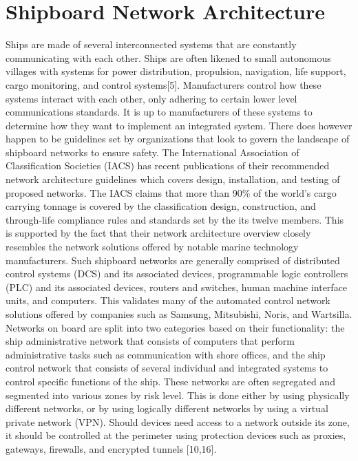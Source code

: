 \documentclass{report}
\begin{document}
\chapter{Shipboard Network Architecture}

Ships are made of several interconnected systems that are constantly communicating with each other. Ships are often likened to small autonomous villages with systems for power distribution, propulsion, navigation, life support, cargo monitoring, and control systems[5]. Manufacturers control how these systems interact with each other, only adhering to certain lower level communications standards. It is up to manufacturers of these systems to determine how they want to implement an integrated system. There does however happen to be guidelines set by organizations that look to govern the landscape of shipboard networks to ensure safety. The International Association of Classification Societies (IACS) has recent publications of their recommended network architecture guidelines which covers design, installation, and testing of proposed networks. The IACS claims that more than 90\% of the world's cargo carrying tonnage is covered by the classification design, construction, and through-life compliance rules and standards set by the its twelve members. This is supported by the fact that their network architecture overview closely resembles the network solutions offered by notable marine technology manufacturers. Such shipboard networks are generally comprised of distributed control systems (DCS) and its associated devices, programmable logic controllers (PLC) and its associated devices, routers and switches, human machine interface units, and computers. This validates many of the automated control network solutions offered by companies such as Samsung, Mitsubishi, Noris, and Wartsilla.  Networks on board are split into two categories based on their functionality: the ship administrative network that consists of computers that perform administrative tasks such as communication with shore offices, and the ship control network that consists of several individual and integrated systems to control specific functions of the ship. These networks are often segregated and segmented into various zones by risk level. This is done either by using physically different networks, or by using logically different networks by using a virtual private network (VPN). Should devices need access to a network outside its zone, it should be controlled at the perimeter using protection devices such as proxies, gateways, firewalls, and encrypted tunnels [10,16]. 
\end{document}
